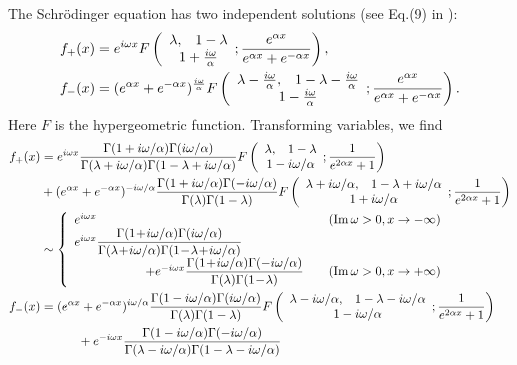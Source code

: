 \documentclass[a4paper,11pt]{article}
\newcommand{\F}[4]{
	F\left(
	\begin{array}{cc}
		#1, & #2 \\
		\multicolumn{2}{c}{#3}
	\end{array}; #4
	\right)
}
\begin{document}
The Schr\"{o}dinger equation
has two independent solutions
(see Eq.(9) in \cite{Cevik:2016mnr}):
\begin{align}
    f_+(x)
    &= e^{i\omega x}
    \F{\lambda}{1-\lambda}{1+\frac{i\omega}{\alpha}}
    {\frac{e^{\alpha x}}{ e^{\alpha x}+e^{-\alpha x} }}, \\
    f_-(x)
    &= (e^{\alpha x}+e^{-\alpha x})^{\frac{i\omega}{\alpha}}
    \F{\lambda-\frac{i\omega}{\alpha}}{1-\lambda-\frac{i\omega}{\alpha}}
    {1-\frac{i\omega}{\alpha}}
    {\frac{e^{\alpha x}}{ e^{\alpha x}+e^{-\alpha x} }}.
\end{align}
Here $F$ is the hypergeometric function.
Transforming variables, we find
\begin{align}
	f_+(x)
        &= e^{i\omega x}
	\frac{\Gamma(1+i\omega/\alpha)\Gamma(i\omega/\alpha)}
	{\Gamma(\lambda+i\omega/\alpha)\Gamma(1-\lambda+i\omega/\alpha)}
	\F{\lambda}{1-\lambda}{1-i\omega/\alpha}
	{\frac{1}{e^{2\alpha x}+1}} \notag\\
	&
	+(e^{\alpha x}+e^{-\alpha x})^{-i\omega/\alpha}
	\frac{\Gamma(1+i\omega/\alpha)\Gamma(-i\omega/\alpha)}
	{\Gamma(\lambda)\Gamma(1-\lambda)}
	\F{\lambda+i\omega/\alpha}{1-\lambda+i\omega/\alpha}
	{1+i\omega/\alpha}
	{\frac{1}{e^{2\alpha x}+1}} \notag\\
        &\sim \left\{
        \begin{array}{ll}
            e^{i\omega x}
            & \quad (\Im\omega>0, x\rightarrow -\infty) \\
            e^{i\omega x}
    	\dfrac{\Gamma(1\!+\!i\omega/\alpha)\Gamma(i\omega/\alpha)}
            {\Gamma(\lambda\!+\!i\omega/\alpha)\Gamma(1\!-\!\lambda\!+\!i\omega/\alpha)}& \\
            \hspace{20mm}+ e^{-i\omega x}
            \dfrac{\Gamma(1\!+\!i\omega/\alpha)\Gamma(-i\omega/\alpha)}
            {\Gamma(\lambda)\Gamma(1\!-\!\lambda)}
            & \quad (\Im\omega>0, x\rightarrow +\infty)
        \end{array}
        \right. \\
	f_-(x)
        &= (e^{\alpha x}+e^{-\alpha x})^{i\omega/\alpha}
	\frac{\Gamma(1-i\omega/\alpha)\Gamma(i\omega/\alpha)}
	{\Gamma(\lambda)\Gamma(1-\lambda)}
	\F{\lambda-i\omega/\alpha}{1-\lambda-i\omega/\alpha}
	{1-i\omega/\alpha}
	{\frac{1}{e^{2\alpha x}+1}} \notag\\
	&\qquad\quad
	+e^{-i\omega x}
	\frac{\Gamma(1-i\omega/\alpha)\Gamma(-i\omega/\alpha)}
	{\Gamma(\lambda-i\omega/\alpha)\Gamma(1-\lambda-i\omega/\alpha)}

\end{align}
\end{document}

